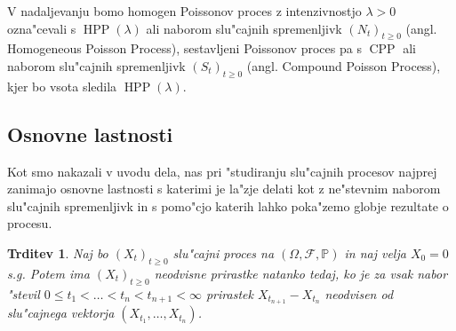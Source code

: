 \documentclass[12pt, a4paper, reqno]{amsart}
\theoremstyle{definition}
\theoremstyle{plain}
\newtheorem{trditev}[definicija]{Trditev}
\newtheorem{posledica}[definicija]{Posledica}
\newcommand{\F}{\mathcal{F}}
\newcommand{\1}{\mathds{1}}
\DeclareMathOperator{\HPP}{HPP}
\DeclareMathOperator{\CPP}{CPP}
\begin{document}
    V nadaljevanju bomo homogen Poissonov proces z intenzivnostjo $\lambda >0$ ozna"cevali s $\HPP(\lambda)$ 
    ali naborom slu"cajnih spremenljivk $(N_t)_{t\geq0}$ (angl. Homogeneous Poisson Process), 
    sestavljeni Poissonov proces pa s $\CPP$ ali naborom slu"cajnih spremenljivk $(S_t)_{t\geq0}$ 
    (angl. Compound Poisson Process), kjer bo vsota sledila $\HPP(\lambda)$. 

    \subsection{Osnovne lastnosti}
    
        Kot smo nakazali v uvodu dela, nas pri "studiranju slu"cajnih procesov najprej zanimajo osnovne 
        lastnosti s katerimi je la"zje delati kot z ne"stevnim naborom slu"cajnih spremenljivk in s pomo"cjo 
        katerih lahko poka"zemo globje rezultate o procesu. 


        \begin{trditev}
            Naj bo $(X_t)_{t\geq0}$ slu"cajni proces na $(\Omega, \F, \mathbb{P})$ in naj velja $X_0 = 0$ s.g.
            Potem ima $(X_t)_{t\geq0}$
            neodvisne prirastke natanko tedaj, ko je za vsak nabor "stevil 
            $0 \leq t_1 < \ldots < t_n < t_{n+1} <\infty$ prirastek $X_{t_{n+1}} - X_{t_n}$ neodvisen od
            slu"cajnega vektorja $(X_{t_1}, \dots, X_{t_n})$.
            \label{trd:ekvivKarakterizacija}
        \end{trditev}
\end{document}
